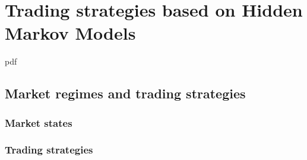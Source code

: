 \chapter{Trading strategies based on Hidden Markov Models}

\if
pdf
    \graphicspath{{Chapter5/Figs/Raster/}{Chapter5/Figs/PDF/}{Chapter5/Figs/}}
\else
    \graphicspath{{Chapter5/Figs/Vector/}{Chapter5/Figs/}}
\fi


\section{Market regimes and trading strategies}

\subsection{Market states}

\subsection{Trading strategies}
